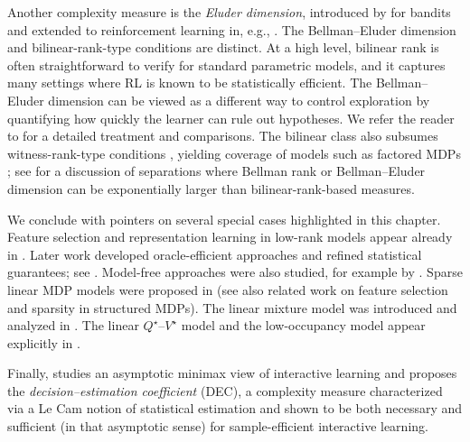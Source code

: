 Another complexity measure is the \emph{Eluder dimension}, introduced by \citet{eluder} for
bandits and extended to reinforcement learning in, e.g.,
\citet{osband2014model,wang2020reinforcement,ayoub2020model,jin2021bellman}.
The Bellman--Eluder dimension and bilinear-rank-type conditions are distinct.
At a high level, bilinear rank is often straightforward to verify for standard parametric models,
and it captures many settings where RL is known to be statistically efficient.
The Bellman--Eluder dimension can be viewed as a different way to control exploration by quantifying
how quickly the learner can rule out hypotheses.  We refer the reader to \citet{jin2021bellman} for a
detailed treatment and comparisons.  The bilinear class also subsumes witness-rank-type conditions
\citep{sun2019model}, yielding coverage of models such as factored
MDPs \citep{kearns1999efficient};  see \citet{bilinear} for a
discussion of separations where Bellman rank or Bellman--Eluder
dimension can be exponentially larger than bilinear-rank-based measures. 

We conclude with pointers on several special cases highlighted in this chapter.
Feature selection and representation learning in low-rank models appear already in
\citet{jiang2017contextual}.  Later work developed oracle-efficient approaches and refined statistical
guarantees; see \citet{agarwal2020flambe,uehara2021representation}.
Model-free approaches were also studied, for example by
\citet{modi2021model}.  Sparse linear MDP models were proposed in \citet{hao2021online} (see also related work on feature selection and sparsity in structured MDPs).
The linear mixture model was introduced and analyzed in
\citet{modi2020sample,ayoub2020model,zhou2021provably,zhou2021nearly}.
The linear $Q^\star$--$V^\star$ model and the low-occupancy model
appear explicitly in \citet{bilinear}. 

Finally, \citet{foster2023dec} studies an asymptotic minimax view of interactive learning and proposes
the \emph{decision--estimation coefficient} (DEC), a complexity measure characterized via a Le Cam
notion of statistical estimation and shown to be both necessary and sufficient (in that asymptotic
sense) for sample-efficient interactive learning.